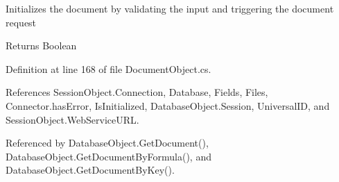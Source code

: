 Initializes the document by validating the input and triggering the document request 

\begin{DoxyReturn}{Returns}
Boolean
\end{DoxyReturn}


Definition at line 168 of file Document\+Object.\+cs.



References Session\+Object.\+Connection, Database, Fields, Files, Connector.\+has\+Error, Is\+Initialized, Database\+Object.\+Session, Universal\+ID, and Session\+Object.\+Web\+Service\+U\+RL.



Referenced by Database\+Object.\+Get\+Document(), Database\+Object.\+Get\+Document\+By\+Formula(), and Database\+Object.\+Get\+Document\+By\+Key().


